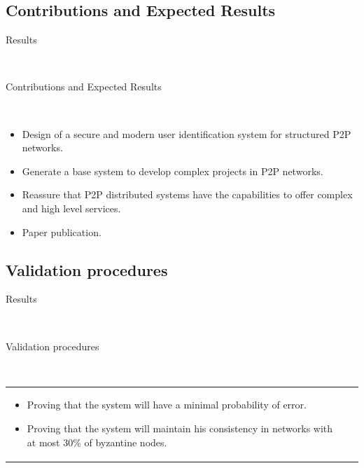 \documentclass[12pt]{beamer}
\renewcommand{\frametitle}[1]{\vspace{0.2cm}\begin{huge}#1\end{huge}\\}
\renewcommand{\framesubtitle}[1]{\vspace{0.4cm} \hspace{0.4cm}\begin{large}#1\end{large}\\}
\begin{document}
  \subsection{Contributions and Expected Results}
    \begin{frame}
    \frametitle{Results}
    \framesubtitle{Contributions and Expected Results}
      \begin{itemize}
          \item Design of a secure and modern user identification system for
                structured P2P networks.
          \item Generate a base system to develop complex projects in P2P networks.
          \item Reassure that P2P distributed systems have the capabilities to offer
                complex and high level services.
          \item Paper publication.
      \end{itemize}
    \end{frame}

  \subsection{Validation procedures}
    \begin{frame}
    \frametitle{Results}
    \framesubtitle{Validation procedures}
    \begin{table}
    \begin{tabular}{p{7cm}p{3cm}}
      \begin{itemize}
          \item Proving that the system will have a minimal probability of error.
          \item Proving that the system will  maintain his consistency in networks with at most 30\% of byzantine nodes. 
      \end{itemize}
    &
    \vspace{1.5cm}
    \end{tabular}
    \end{table}
    \end{frame}
\end{document}
